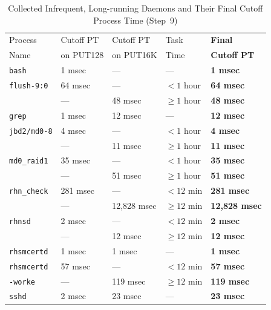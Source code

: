 \documentclass[letter]{ieice}
\begin{document}
\vspace{-0.1in}
\begin{table}[h]
\centering
{\scriptsize
\begin{tabular}{|p{1.2cm}|p{1.2cm}|p{1.4cm}|p{1cm}|p{1.45cm}|} \hline
{\tiny Process}  & {\tiny Cutoff PT} & {\tiny Cutoff PT} & {\tiny Task}  & {\tiny{\bf Final }} \\
{\tiny Name} & {\tiny on PUT128}  & {\tiny on PUT16K} & {\tiny Time} & {\tiny {\bf Cutoff PT}} \\\hline
{\tt bash} & 1 msec & --- & --- & {\bf 1 msec} \\ \hline
{\tt flush-9:0} & 64 msec & --- & $< 1$ hour & {\bf 64 msec} \\
                & ---     & 48 msec & $\geq 1$ hour & {\bf 48 msec} \\ \hline
{\tt grep }     & 1 msec & 12 msec & --- & {\bf 12 msec}\\ \hline
{\tt jbd2/md0-8} & 4 msec & --- & $< 1$ hour & {\bf 4 msec} \\
                & ---     & 11 msec & $\geq 1$ hour & {\bf 11 msec} \\ \hline
{\tt md0\_raid1} & 35 msec & ---     & $< 1$ hour  & {\bf 35 msec}\\
                 & ---     & 51 msec & $\geq 1$ hour & {\bf 51 msec} \\ \hline
{\tt rhn\_check}  & 281 msec & --- & $< 12$ min & {\bf 281 msec} \\
                 &  --- & 12,828 msec & $\geq 12$ min & {\bf 12,828 msec}\\ \hline
{\tt rhnsd} & 2 msec & --- & $< 12$ min & {\bf 2 msec} \\
            & ---    & 12 msec &$\geq 12$ min & {\bf 12 msec} \\ \hline
{\tt rhsmcertd}  & 1 msec & 1 msec & --- & {\bf 1 msec} \\  \hline
{\tt rhsmcertd}  & 57 msec & --- & $< 12$ min & {\bf 57 msec} \\
{\tt -worke}           &  --- & 119 msec  & $\geq 12$ min & {\bf 119 msec}\\ \hline
{\tt sshd} & 2 msec & 23 msec & --- & {\bf 23 msec}\\ \hline
\end{tabular}
}
\caption{Collected Infrequent, Long-running Daemons and Their Final Cutoff
  Process Time \hbox{(Step~9)}\label{tab:final_infrequent_cutoff}}
  \vspace{-0.15in}
\end{table}
\end{document}
